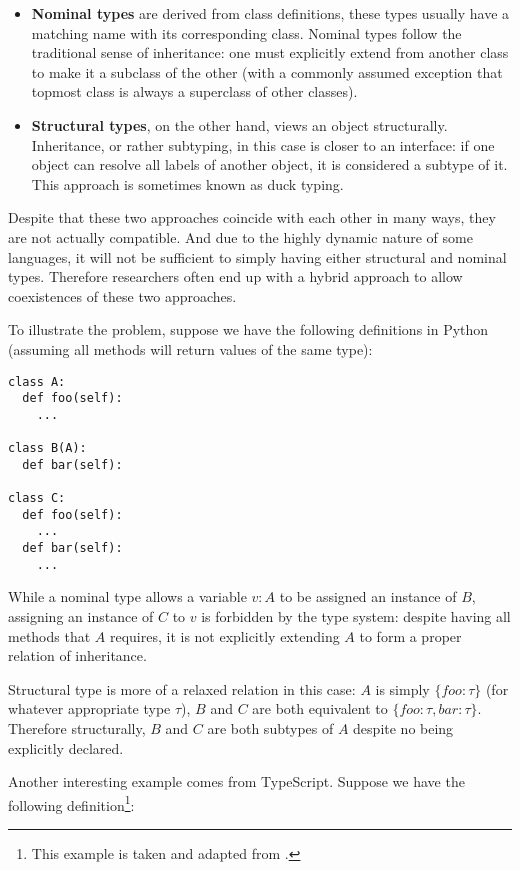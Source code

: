 \begin{itemize}
	\item \textbf{Nominal types} are derived from class definitions, these types usually have a matching name with its
	corresponding class.  Nominal types follow the traditional sense of inheritance:
	one must explicitly extend from another class to make it a subclass of the other
	(with a commonly assumed exception that topmost class is always a superclass of other classes).
	\item \textbf{Structural types}, on the other hand, views an object structurally.
	Inheritance, or rather subtyping, in this case is closer to an interface: if one object can resolve all labels of another object, it is considered a subtype of it. This approach is sometimes known as duck typing.
\end{itemize}

Despite that these two approaches coincide with each other in many ways,
they are not actually compatible.
And due to the highly dynamic nature of some languages,
it will not be sufficient to simply having either structural and
nominal types.
Therefore researchers often end up with a hybrid approach
to allow coexistences of these two approaches.

To illustrate the problem, suppose we have the following definitions in Python
(assuming all methods will return values of the same type):

\begin{verbatim}
class A:
  def foo(self):
    ...

class B(A):
  def bar(self):

class C:
  def foo(self):
    ...
  def bar(self):
    ...
\end{verbatim}

While a nominal type allows a variable $v : A$ to be assigned an instance of $B$,
assigning an instance of $C$ to $v$ is forbidden by the type system: despite
having all methods that $A$ requires, it is not explicitly extending $A$ to form a proper relation of
inheritance.

Structural type is more of a relaxed relation in this case: $A$ is simply $\{foo: \tau \}$ (for whatever appropriate type $\tau$), $B$ and $C$ are both equivalent to $\{foo: \tau, bar: \tau\}$. Therefore structurally, $B$ and $C$ are both subtypes of $A$ despite no being explicitly declared.

Another interesting example comes from TypeScript.
Suppose we have the following definition\footnote{This example is taken and adapted from \cite{rastogi2015safe}.}:

